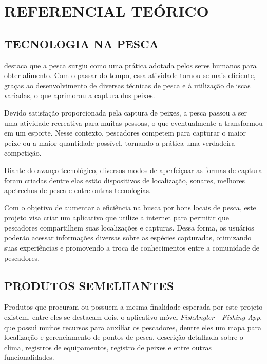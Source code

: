 
\chapter{REFERENCIAL TEÓRICO}
\label{chap:referencialTeorico}

\section{TECNOLOGIA NA PESCA}
\label{sec:referenciasDeDesenvolvimento}

 destaca que a pesca surgiu como uma prática adotada pelos seres humanos para obter alimento. Com o passar do tempo, essa atividade tornou-se mais eficiente, graças ao desenvolvimento de diversas técnicas de pesca e à utilização de iscas variadas, o que aprimorou a captura dos peixes.

Devido satisfação proporcionada pela captura de peixes, a pesca passou a ser uma atividade recreativa para muitas pessoas, o que eventualmente a transformou em um esporte. Nesse contexto, pescadores competem para capturar o maior peixe ou a maior quantidade possível, tornando a prática uma verdadeira competição.

Diante do avanço tecnológico, diversos modos de aperfeiçoar as formas de captura foram criadas dentre elas estão dispositivos de localização, sonares, melhores apetrechos de pesca e entre outras tecnologias.

Com o objetivo de aumentar a eficiência na busca por bons locais de pesca, este projeto visa criar um aplicativo que utilize a internet para permitir que pescadores compartilhem suas localizações e capturas. Dessa forma, os usuários poderão acessar informações diversas sobre as espécies capturadas, otimizando suas experiências e promovendo a troca de conhecimentos entre a comunidade de pescadores.

\section{PRODUTOS SEMELHANTES}
\label{sec:referenciasDeDesenvolvimento}

Produtos que procuram ou possuem a mesma finalidade esperada por este projeto existem, entre eles se destacam dois, o aplicativo móvel \textit{FishAngler - Fishing App}, que possui muitos recursos para auxiliar os pescadores, dentre eles um mapa para localização e gerenciamento de pontos de pesca, descrição detalhada sobre o clima, registros de equipamentos, registro de peixes e entre outras funcionalidades.

